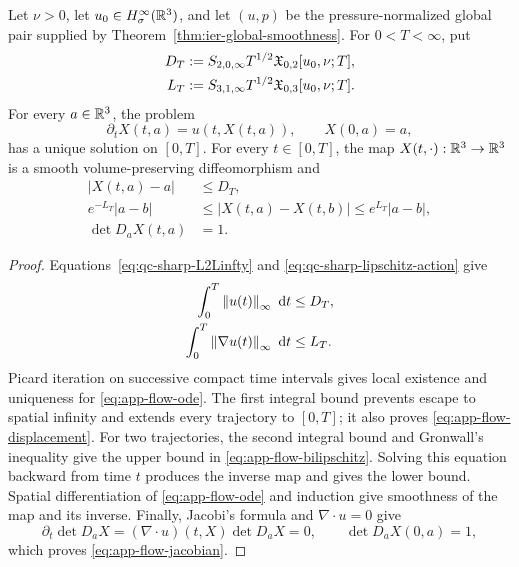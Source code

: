 \begin{theorem}
\label{thm:app-material-flow}
Let \(\nu>0\), let \(u_0\in H^\infty_\sigma(\mathbb R^3)\), and let \((u,p)\) be
the pressure-normalized global pair supplied by
Theorem~\ref{thm:ier-global-smoothness}.
For \(0<T<\infty\), put
\begin{align}
 D_T&:=S_{2,0,\infty}T^{1/2}
 \mathfrak X_{0,2}[u_0,\nu;T],\notag\\
 L_T&:=S_{3,1,\infty}T^{1/2}
 \mathfrak X_{0,3}[u_0,\nu;T].
 \label{eq:app-flow-actions}
\end{align}
For every \(a\in\mathbb R^3\), the problem
\begin{equation}
 \partial_tX(t,a)=u(t,X(t,a)),
 \qquad X(0,a)=a,
 \label{eq:app-flow-ode}
\end{equation}
has a unique solution on \([0,T]\).  For every \(t\in[0,T]\), the map
\(X(t,\cdot):\mathbb R^3\to\mathbb R^3\) is a smooth volume-preserving diffeomorphism
and
\begin{align}
 |X(t,a)-a|&\le D_T,
 \label{eq:app-flow-displacement}\\
 e^{-L_T}|a-b|
 &\le|X(t,a)-X(t,b)|
 \le e^{L_T}|a-b|,
 \label{eq:app-flow-bilipschitz}\\
 \det D_aX(t,a)&=1.
 \label{eq:app-flow-jacobian}
\end{align}
\end{theorem}

\begin{proof}
Equations~\eqref{eq:qc-sharp-L2Linfty} and
\eqref{eq:qc-sharp-lipschitz-action} give
\begin{align*}
 \int_0^T\left\lVert u(t)\right\rVert_\infty\,\,\mathrm d t&\le D_T,\\
 \int_0^T\left\lVert \nabla u(t)\right\rVert_\infty\,\,\mathrm d t&\le L_T.
\end{align*}
Picard iteration on successive compact time intervals gives local
existence and uniqueness for \eqref{eq:app-flow-ode}.  The first integral
bound prevents escape to spatial infinity and extends every trajectory to
\([0,T]\); it also proves \eqref{eq:app-flow-displacement}.  For two
trajectories, the second integral bound and Gronwall's inequality give the
upper bound in \eqref{eq:app-flow-bilipschitz}.  Solving this equation
backward from time \(t\) produces the inverse map and gives the lower
bound.  Spatial differentiation of \eqref{eq:app-flow-ode} and induction
give smoothness of the map and its inverse.  Finally, Jacobi's formula and
\(\nabla\cdot u=0\) give
\[
 \partial_t\det D_aX
 =(\nabla\cdot u)(t,X)\det D_aX=0,
 \qquad \det D_aX(0,a)=1,
\]
which proves \eqref{eq:app-flow-jacobian}.
\end{proof}

